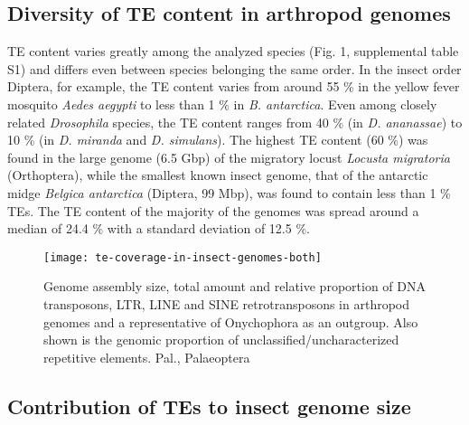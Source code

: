 \subsection{Diversity of TE content in arthropod
genomes}\label{diversity-of-te-content-in-arthropod-genomes}

TE content varies greatly among the analyzed species (Fig. 1,
supplemental table S1) and differs even between species belonging the
same order. In the insect order Diptera, for example, the TE content
varies from around 55 \% in the yellow fever mosquito \emph{Aedes
aegypti} to less than 1 \% in \emph{B. antarctica}. Even among closely
related \emph{Drosophila} species, the TE content ranges from 40 \% (in
\emph{D. ananassae}) to 10 \% (in \emph{D. miranda} and \emph{D.
simulans}). The highest TE content (60 \%) was found in the large genome
(6.5 Gbp) of the migratory locust \emph{Locusta migratoria}
(Orthoptera), while the smallest known insect genome, that of the
antarctic midge \emph{Belgica antarctica} (Diptera, 99 Mbp), was found
to contain less than 1 \% TEs. The TE content of the majority of the
genomes was spread around a median of 24.4 \% with a standard deviation
of 12.5 \%.

\begin{figure}[h!]
\begin{center}
\texttt{[image: te-coverage-in-insect-genomes-both]}
\caption[TE coverage in arthropod genomes]{{Genome assembly size, total
amount and relative proportion of DNA transposons, LTR, LINE and SINE
retrotransposons in arthropod genomes and a representative of
Onychophora as an outgroup. Also shown is the genomic proportion of
unclassified/uncharacterized repetitive elements.  Pal., Palaeoptera%
}}
\end{center}
\end{figure}

\subsection{Contribution of TEs to insect genome
size}\label{contribution-of-tes-to-insect-genome-size}

